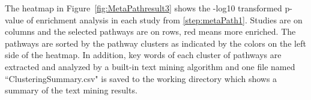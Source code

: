 The heatmap in Figure~\ref{fig:MetaPathresult3} shows the -log10 transformed p-value of enrichment analysis in each study from \ref{step:metaPath1}. 
Studies are on columns and the selected pathways are on rows, red means more enriched. The pathways are sorted by the pathway clusters as indicated by the colors on the left side of the heatmap. 
In addition, 
key words of each cluster of pathways are extracted and analyzed by a built-in text mining algorithm and one file named ``Clustering\textunderscore Summary.csv" is saved to the working directory which shows a summary of the text mining results. 


